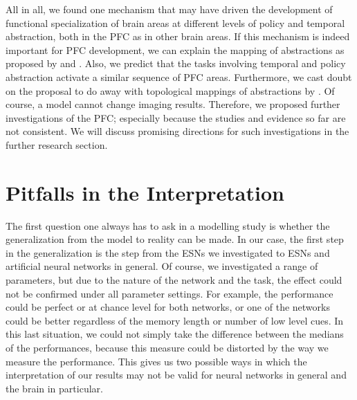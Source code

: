 \documentclass[10pt,a4paper]{report}
\begin{document}
All in all, we found one mechanism that may have driven the development of functional specialization of brain areas at different levels of policy and temporal abstraction, both in the PFC as in other brain areas. If this mechanism is indeed important for PFC development, we can explain the mapping of abstractions as proposed by \citet{Koechlin2003} and \citet{Badre2007}. Also, we predict that the tasks involving temporal and policy abstraction activate a similar sequence of PFC areas. Furthermore, we cast doubt on the proposal to do away with topological mappings of abstractions by \citet{Reynolds2012}. Of course, a model cannot change imaging results. Therefore, we proposed further investigations of the PFC; especially because the studies and evidence so far are not consistent. We will discuss promising directions for such investigations in the further research section.

\section{Pitfalls in the Interpretation}


The first question one always has to ask in a modelling study is whether the generalization from the model to reality can be made. In our case, the first step in the generalization is the step from the ESNs we investigated to ESNs and artificial neural networks in general. Of course, we investigated a range of parameters, but due to the nature of the network and the task, the effect could not be confirmed under all parameter settings. For example, the performance could be perfect or at chance level for both networks, or one of the networks could be better regardless of the memory length or number of low level cues. In this last situation, we could not simply take the difference between the medians of the performances, because this measure could be distorted by the way we measure the performance. This gives us two possible ways in which the interpretation of our results may not be valid for neural networks in general and the brain in particular.
\end{document}
